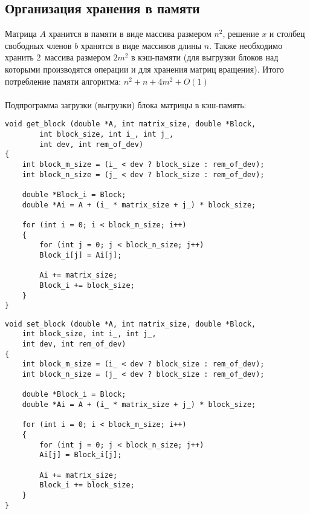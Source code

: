 \documentclass[a4paper, fontsize=14pt]{article}
\begin{document}
		\subsection{Организация хранения в памяти}
		Матрица $A$ хранится в памяти в виде массива размером $n^2$, решение $x$ и столбец свободных членов $b$ хранятся в виде массивов длины $n$. Также необходимо хранить $2\,$ массива размером $2m^2$ в кэш-памяти (для выгрузки блоков над которыми производятся операции и для хранения матриц вращения). Итого потребление памяти алгоритма: $n^2 + n + 4m^2 + O(1)$
		\\
		\\Подпрограмма загрузки (выгрузки) блока матрицы в кэш-память:
		\begin{lstlisting}
void get_block (double *A, int matrix_size, double *Block,
		int block_size, int i_, int j_,
		int dev, int rem_of_dev)
{
	int block_m_size = (i_ < dev ? block_size : rem_of_dev);
	int block_n_size = (j_ < dev ? block_size : rem_of_dev);
	
	double *Block_i = Block;
	double *Ai = A + (i_ * matrix_size + j_) * block_size;
	
	for (int i = 0; i < block_m_size; i++)
	{
		for (int j = 0; j < block_n_size; j++)
		Block_i[j] = Ai[j];
		
		Ai += matrix_size;
		Block_i += block_size;
	}
}
		\end{lstlisting}

		\begin{lstlisting}
void set_block (double *A, int matrix_size, double *Block,
	int block_size, int i_, int j_,
	int dev, int rem_of_dev)
{
	int block_m_size = (i_ < dev ? block_size : rem_of_dev);
	int block_n_size = (j_ < dev ? block_size : rem_of_dev);
	
	double *Block_i = Block;
	double *Ai = A + (i_ * matrix_size + j_) * block_size;
	
	for (int i = 0; i < block_m_size; i++)
	{
		for (int j = 0; j < block_n_size; j++)
		Ai[j] = Block_i[j];
		
		Ai += matrix_size;
		Block_i += block_size;
	}
}
		\end{lstlisting}
		
\end{document}
